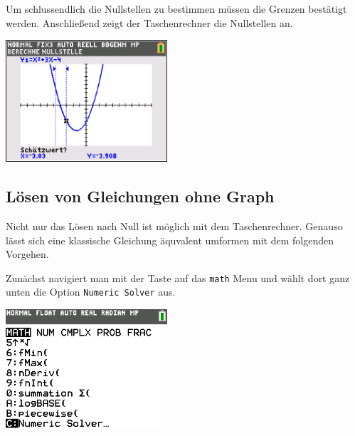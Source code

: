 \begin{paracol}{2}
	\begin{flushleft}
	Um schlussendlich die Nullstellen zu bestimmen müssen die Grenzen bestätigt werden. Anschließend zeigt der Taschenrechner die Nullstellen an.
		\end{flushleft}
\switchcolumn
	\begin{flushright}
	\includegraphics[width= 6cm]{Media/GRT/Visualisierung/loesen_gleichung/loesen_gleichung_4.png}
		\end{flushright}
		
\end{paracol}
\pagebreak

\subsection{Lösen von Gleichungen ohne Graph}
Nicht nur das Lösen nach Null ist möglich mit dem Taschenrechner. Genauso lässt sich eine klassische Gleichung äquvalent umformen mit dem folgenden Vorgehen.

\begin{paracol}{2}
	\begin{flushleft}
	Zunächst navigiert man mit der Taste  auf das \texttt{math} Menu und wählt dort ganz unten die Option \texttt{Numeric Solver} aus. 
	\end{flushleft}	
\switchcolumn
	\begin{flushright}
		\includegraphics[width=6cm]{Media/GRT/Visualisierung/Gleichung_loesen_aequivalent/Gleichung_loesen_aequivalent_1.png}
	\end{flushright}
\end{paracol}

